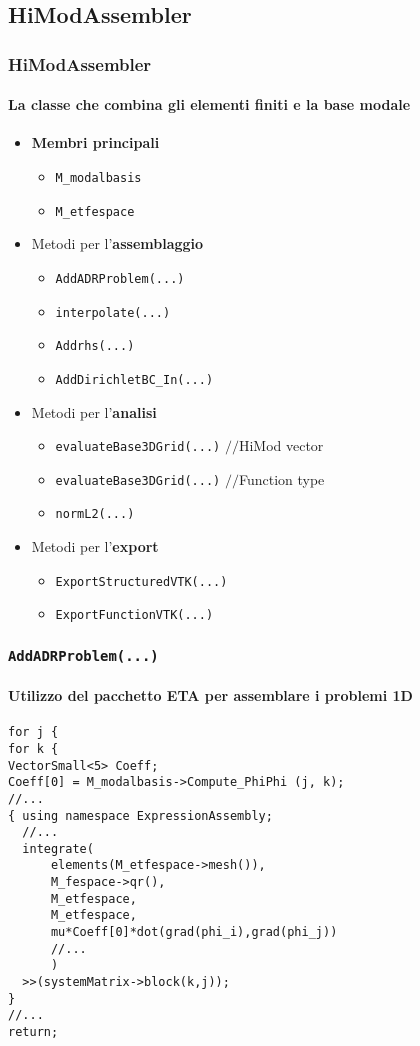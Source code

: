 \subsection{HiModAssembler}
\begin{frame}
 \frametitle{HiModAssembler}
 \framesubtitle{La classe che combina gli elementi finiti e la base modale}
 \begin{itemize}
  \item \textbf{Membri principali}
  \begin{itemize}
   \item \texttt{M\_modalbasis}
   \item \texttt{M\_etfespace}
  \end{itemize}

  \item Metodi per l'\textbf{assemblaggio}
  \begin{itemize}
   \item \texttt{AddADRProblem(...)}
   \item \texttt{interpolate(...)}
   \item \texttt{Addrhs(...)}
   \item \texttt{AddDirichletBC\_In(...)}
  \end{itemize}

  \item Metodi per l'\textbf{analisi}
  \begin{itemize}
   \item \texttt{evaluateBase3DGrid(...)} \textcolor{green!50!black}{$//$HiMod vector}
   \item \texttt{evaluateBase3DGrid(...)} \textcolor{green!50!black}{$//$Function type}
   \item \texttt{normL2(...)}
  \end{itemize}

  \item Metodi per l'\textbf{export}
  \begin{itemize}
   \item \texttt{ExportStructuredVTK(...)}
   \item \texttt{ExportFunctionVTK(...)}
  \end{itemize}

 \end{itemize}

\end{frame}
\begin{frame}[fragile]
 \frametitle{\texttt{AddADRProblem(...)}}
 \framesubtitle{Utilizzo del pacchetto ETA per assemblare i problemi 1D}
 \begin{lstlisting}[style=general]
for j {
for k {
VectorSmall<5> Coeff;
Coeff[0] = M_modalbasis->Compute_PhiPhi (j, k);
//...
{ using namespace ExpressionAssembly;
  //...
  integrate(
      elements(M_etfespace->mesh()),
      M_fespace->qr(),
      M_etfespace,
      M_etfespace,
      mu*Coeff[0]*dot(grad(phi_i),grad(phi_j))
      //...
      )
  >>(systemMatrix->block(k,j));
}
//...
return;
\end{lstlisting}
\end{frame}